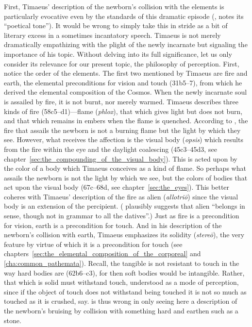 First, Timaeus' description of the newborn's collision with the elements is particularly evocative even by the standards of this dramatic episode (\citealt[149 n10]{Archer-Hind:1888qd}, notes its ``poetical tone''). It would be wrong to simply take this in stride as a bit of literary excess in a sometimes incantatory speech. Timaeus is not merely dramatically empathizing with the plight of the newly incarnate but signaling the importance of his topic. Without delving into its full significance, let us only consider its relevance for our present topic, the philosophy of perception. First, notice the order of the elements. The first two mentioned by Timaeus are fire and earth, the elemental preconditions for vision and touch (31b5--7), from which he derived the elemental composition of the Cosmos. When the newly incarnate soul is assailed by fire, it is not burnt, nor merely warmed. Timaeus describes three kinds of fire (58c5–d1)---flame (\emph{phlox}), that which gives light but does not burn, and that which remains in embers when the flame is quenched. According to \cite[149 n10]{Archer-Hind:1888qd}, the fire that assails the newborn is not a burning flame but the light by which they see. However, what receives the affection is the visual body (\emph{opsis}) which results from the fire within the eye and the daylight coalescing (45c3–45d3, see chapter~\ref{sec:the_compounding_of_the_visual_body}). This is acted upon by the color of a body which Timaeus conceives as a kind of flame. So perhaps what assails the newborn is not the light by which we see, but the colors of bodies that act upon the visual body (67c–68d, see chapter~\ref{sec:the_eyes}). This better coheres with Timaeus' description of the fire as alien (\emph{allotriō}) since the visual body is an extension of the percipient. (\citealt[269]{Taylor:1928qb} plausibly suggests that alien ``belongs in sense, though not in grammar to all the datives''.) Just as fire is a precondition for vision, earth is a precondition for touch. And in his description of the newborn's collision with earth, Timaeus emphasizes its solidity (\emph{stereō}), the very feature by virtue of which it is a precondition for touch (see chapters~\ref{sec:the_elemental_composition_of_the_corporeal} and \ref{cha:common_pathemata}). Recall, the tangible is not resistant to touch in the way hard bodies are (62b6–c3), for then soft bodies would be intangible. Rather, that which is solid must withstand touch, understood as a mode of perception, since if the object of touch does not withstand being touched it is not so much as touched as it is crushed, say. \citet[269]{Taylor:1928qb} is thus wrong in only seeing here a description of the newborn's bruising by collision with something hard and earthen such as a stone.

